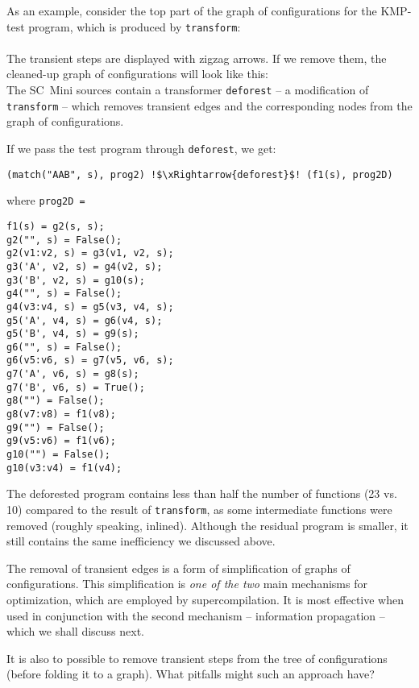 As an example, consider the top part of the graph of configurations 
for the KMP-test program, which is produced by 
\texttt{transform}:\\
\\
The transient steps are displayed with zigzag arrows.
If we remove them, the cleaned-up graph of configurations will look like this:\\


The SC~Mini sources contain a transformer \texttt{deforest} -- a modification
of \texttt{transform} -- which removes transient edges and the corresponding nodes
from the graph of configurations.

If we pass the test program through \texttt{deforest}, we get:
\begin{lstlisting}[language=sll,escapechar=!]
(match("AAB", s), prog2) !$\xRightarrow{deforest}$! (f1(s), prog2D)
\end{lstlisting}
where \texttt{prog2D = }
\begin{lstlisting}[language=sll]
f1(s) = g2(s, s);
g2("", s) = False();
g2(v1:v2, s) = g3(v1, v2, s);
g3('A', v2, s) = g4(v2, s);
g3('B', v2, s) = g10(s);
g4("", s) = False();
g4(v3:v4, s) = g5(v3, v4, s);
g5('A', v4, s) = g6(v4, s);
g5('B', v4, s) = g9(s);
g6("", s) = False();
g6(v5:v6, s) = g7(v5, v6, s);
g7('A', v6, s) = g8(s);
g7('B', v6, s) = True();
g8("") = False();
g8(v7:v8) = f1(v8);
g9("") = False();
g9(v5:v6) = f1(v6);
g10("") = False();
g10(v3:v4) = f1(v4);
\end{lstlisting}

The deforested program contains less than half the number of functions (23 vs. 10)
compared to the result of \texttt{transform},
as some intermediate functions were removed (roughly speaking, inlined).
Although the residual program is smaller, it still contains the same inefficiency 
we discussed above.

The removal of transient edges is a form of simplification of graphs of configurations.
This simplification is \emph{one of the two} main mechanisms for optimization,
which are employed by supercompilation. 
It is most effective when used in conjunction with the second mechanism
-- information propagation -- which we shall discuss next.

\begin{exercise}
It is also to possible to remove transient steps from the tree of configurations (before folding it to a graph).
What pitfalls might such an approach have?
\end{exercise}


